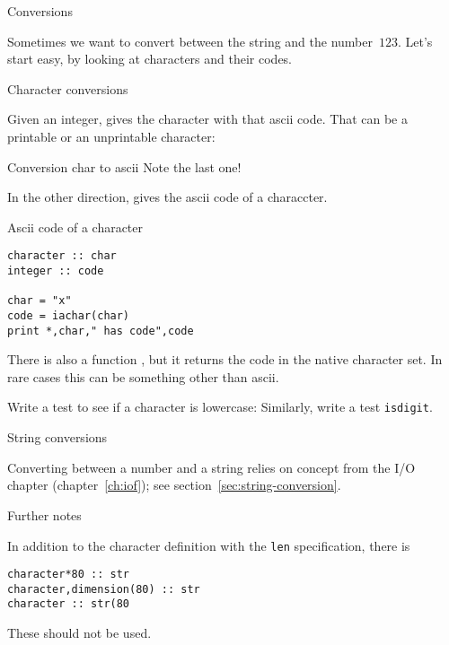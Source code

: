  {Conversions}

Sometimes we want to convert between the string  and the number~$123$.
Let's start easy, by looking at characters and their  codes.

 {Character conversions}
\label{sec:f-ascci-char}

Given an integer,  gives the character with that ascii code.
That can be a printable or an unprintable character:
\begin{block}{Conversion char to ascii}
  \label{sl:f-to-ascii}
  Note the last one!
\end{block}

In the other direction,  gives the ascii code of a characcter.
\begin{block}{Ascii code of a character}
  \label{sl:f-ascii-code}
\begin{lstlisting}
character :: char
integer :: code

char = "x"
code = iachar(char)
print *,char," has code",code  
\end{lstlisting}
\end{block}

\begin{remark}
  There is also a function , but it returns the code
  in the native character set. In rare cases this can be something
  other than ascii.
\end{remark}

\begin{exercise}
  \label{ex:f-test-lower}
  Write a test to see if a character is lowercase:
  Similarly, write a test \lstinline{isdigit}.
\end{exercise}

 {String conversions}

Converting between a number and a string relies on concept
from the  I/O chapter (chapter~\ref{ch:iof});
see section~\ref{sec:string-conversion}.

 {Further notes}

In addition to the character definition with the \lstinline{len} specification,
there is
\begin{lstlisting}
character*80 :: str
character,dimension(80) :: str
character :: str(80
\end{lstlisting}
These should not be used.
